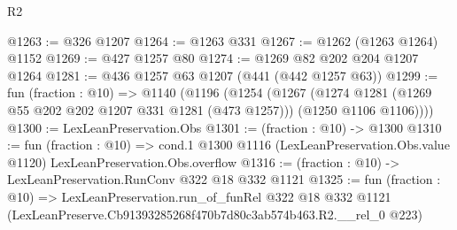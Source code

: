 \begin{lexlean}{R2}
\begin{coremodule}
@1263 := @326 @1207
@1264 := @1263 @331
@1267 := @1262 (@1263 @1264) @1152
@1269 := @427 @1257 @80
@1274 := @1269 @82 @202 @204 @1207 @1264
@1281 := @436 @1257 @63 @1207 (@441 (@442 @1257 @63))
@1299 := fun (fraction : @10) =>
  @1140
    (@1196
      (@1254
        (@1267
          (@1274 @1281 (@1269 @55 @202 @202 @1207 @331 @1281 (@473 @1257)))
          (@1250 @1106 @1106))))
@1300 := LexLeanPreservation.Obs
@1301 := (fraction : @10) -> @1300
@1310 := fun (fraction : @10) =>
  cond.{1} @1300 @1116 (LexLeanPreservation.Obs.value @1120) LexLeanPreservation.Obs.overflow
@1316 := (fraction : @10) -> LexLeanPreservation.RunConv @322 @18 @332 @1121
@1325 := fun (fraction : @10) =>
  LexLeanPreservation.run_of_funRel
    @322
    @18
    @332
    @1121
    (LexLeanPreserve.Cb91393285268f470b7d80c3ab574b463.R2.__rel_0 @223)
\end{coremodule}
\end{lexlean}

